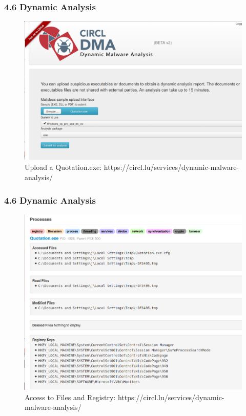 \begin{frame}[fragile]
  \frametitle{4.6 Dynamic Analysis}
    \begin{figure}
        \includegraphics[scale=0.26]{images/dma_3.png}
        \captionsetup{labelformat=empty,labelsep=none}
        \caption[]{\tiny Upload a Quotation.exe: https://circl.lu/services/dynamic-malware-analysis/}
    \end{figure}
\end{frame}


\begin{frame}[fragile]
  \frametitle{4.6 Dynamic Analysis}
    \begin{figure}
        \includegraphics[scale=0.25]{images/dma_4.png}
        \captionsetup{labelformat=empty,labelsep=none}
        \caption[]{\tiny Access to Files and Registry: https://circl.lu/services/dynamic-malware-analysis/}
    \end{figure}
\end{frame}










